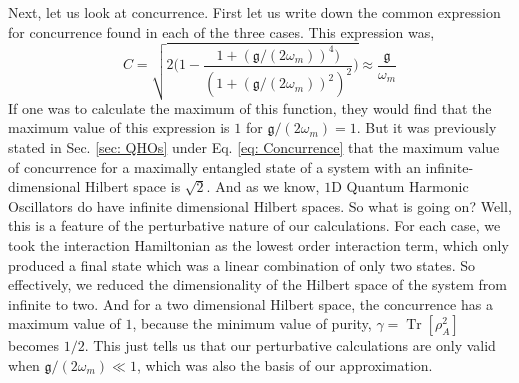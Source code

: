 \documentclass[12pt,a4paper]{report}
\theoremstyle{plain}
\theoremstyle{definition}
\theoremstyle{remark}
\DeclareMathOperator{\Tr}{Tr}
\begin{document}
Next, let us look at concurrence. First let us write down the common expression for concurrence found in each of the three cases. This expression was,
\begin{equation}
    C = \sqrt{2\Bigg(1- \frac{1+(\mathfrak{g}/(2\omega_{m}))^{4})}{(1+(\mathfrak{g}/(2\omega_{m}))^{2})^2}\Bigg)} \approx \frac{\mathfrak{g}}{\omega_{m}}
\end{equation}
If one was to calculate the maximum of this function, they would find that the maximum value of this expression is $1$ for $\mathfrak{g}/(2\omega_{m}) = 1$. But it was previously stated in Sec. \ref{sec: QHOs} under Eq. \ref{eq: Concurrence} that the maximum value of concurrence for a maximally entangled state of a system with an infinite-dimensional Hilbert space is $\sqrt{2}$. And as we know, $1$D Quantum Harmonic Oscillators do have infinite dimensional Hilbert spaces. So what is going on? Well, this is a feature of the perturbative nature of our calculations. For each case, we took the interaction Hamiltonian as the lowest order interaction term, which only produced a final state which was a linear combination of only two states. So effectively, we reduced the dimensionality of the Hilbert space of the system from infinite to two. And for a two dimensional Hilbert space, the concurrence has a maximum value of $1$, because the minimum value of purity, $\gamma = \Tr[\rho_A^2]$ becomes $1/2$. This just tells us that our perturbative calculations are only valid when $\mathfrak{g}/(2\omega_{m}) \ll 1$, which was also the basis of our approximation.
\end{document}
